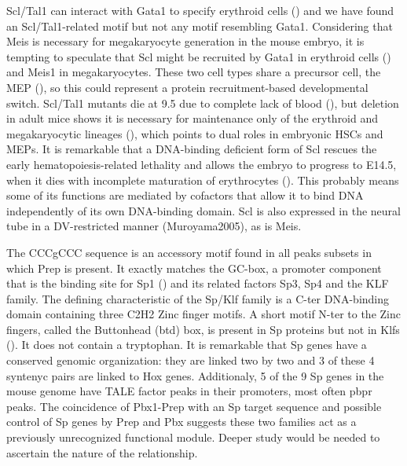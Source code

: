 Scl/Tal1 can interact with Gata1 to specify erythroid cells (\cite{ref}) and we have found an Scl/Tal1-related motif but not any motif resembling Gata1. Considering that Meis is necessary for megakaryocyte generation in the mouse embryo, it is tempting to speculate that Scl might be recruited by Gata1 in erythroid cells (\cite{Anguita2004}) and Meis1 in megakaryocytes. These two cell types share a precursor cell, the \ac{MEP} (\cite{ref}), so this could represent a protein recruitment-based developmental switch. Scl/Tal1 mutants die at 9.5 due to complete lack of blood (\cite{ref}), but deletion in adult mice shows it is necessary for maintenance only of the erythroid and megakaryocytic lineages (\cite{Mikkola2003}), which points to dual roles in embryonic \acp{HSC} and \acp{MEP}. It is remarkable that a DNA-binding deficient form of Scl rescues the early hematopoiesis-related lethality and allows the embryo to progress to E14.5, when it dies with incomplete maturation of erythrocytes (\cite{Porcher1999, Kassouf2008}). This probably means some of its functions are mediated by cofactors that allow it to bind DNA independently of its own DNA-binding domain. Scl is also expressed in the neural tube in a \ac{DV}-restricted manner (Muroyama2005), as is Meis.




The CCCgCCC sequence is an accessory motif found in all peaks subsets in which Prep is present. It exactly matches the GC-box, a promoter component that is the binding site for Sp1 (\cite{Kriwacki1992}) and its related factors Sp3, Sp4 and the KLF family. The defining characteristic of the Sp/Klf family is a \ac{C-ter} DNA-binding domain containing three C2H2 Zinc finger motifs. A short motif \ac{N-ter} to the Zinc fingers, called the Buttonhead (btd) box, is present in Sp proteins but not in Klfs (\cite{Suske2005}). It does not contain a tryptophan. It is remarkable that Sp genes have a conserved genomic organization: they are linked two by two and 3 of these 4 syntenyc pairs are linked to Hox genes. Additionaly, 5 of the 9 Sp genes in the mouse genome have \ac{TALE} factor peaks in their promoters, most often \ac{pbpr} peaks. The coincidence of Pbx1-Prep with an Sp target sequence and possible control of Sp genes by Prep and Pbx suggests these two families act as a previously unrecognized functional module. Deeper study would be needed to ascertain the nature of the relationship. 

